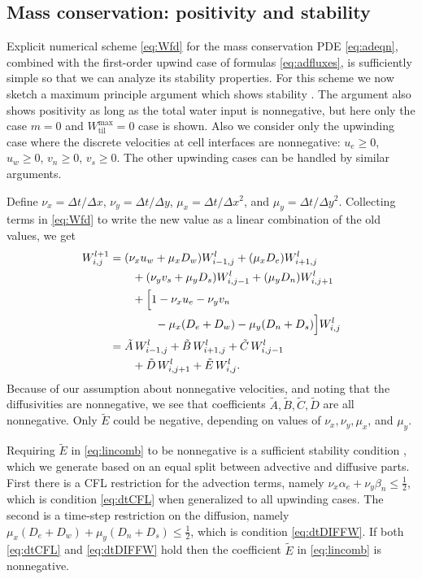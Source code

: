 \documentclass[gmd]{copernicus}   %
\newcommand{\text}{\textrm}
\newcommand{\Wtilmax}{W_{\text{til}}^{\text{max}}}
\newcommand{\Wlij}{W^l_{i,j}}
\begin{document}
\subsection{Mass conservation: positivity and stability}  Explicit numerical scheme \eqref{eq:Wfd} for the mass conservation PDE \eqref{eq:adeqn}, combined with the first-order upwind case of formulas \eqref{eq:adfluxes}, is sufficiently simple so that we can analyze its stability properties.  For this scheme we now sketch a maximum principle argument which shows stability \citep{MortonMayers}.  The argument also shows positivity \citep{HundsdorferVerwer2010} as long as the total water input is nonnegative, but here only the case $m = 0$ and $\Wtilmax=0$ case is shown.  Also we consider only the upwinding case where the discrete velocities at cell interfaces are nonnegative: $u_e\ge 0$, $u_w\ge 0$, $v_n\ge 0$, $v_s\ge 0$.  The other upwinding cases can be handled by similar arguments.

Define $\nu_x = \Delta t/\Delta x$, $\nu_y = \Delta t/\Delta y$, $\mu_x = \Delta t/\Delta x^2$, and $\mu_y = \Delta t/\Delta y^2$.  Collecting terms in \eqref{eq:Wfd} to write the new value as a linear combination of the old values, we get
\begin{align}
 W_{i,j}^{l+1} &= (\nu_x u_w + \mu_x D_w) W_{i-1,j}^l + (\mu_x D_e) W_{i+1,j}^l \notag \\
      &\qquad + (\nu_y v_s + \mu_y D_s) W_{i,j-1}^l + (\mu_y D_n) W_{i,j+1}^l  \notag \\
      &\qquad + \Big[1 - \nu_x u_e - \nu_y v_n \notag \\
      &\qquad\qquad - \mu_x (D_e + D_w) - \mu_y (D_n + D_s)\Big] \Wlij \notag \\
  &= \tilde A\, W_{i-1,j}^l + \tilde B\, W_{i+1,j}^l + \tilde C\, W_{i,j-1}^l \notag \\
  &\qquad + \tilde D\, W_{i,j+1}^l + \tilde E\, \Wlij. \label{eq:lincomb}
\end{align}
Because of our assumption about nonnegative velocities, and noting that the diffusivities are nonnegative, we see that coefficients $\tilde A,\tilde B,\tilde C,\tilde D$ are all nonnegative.  Only $\tilde E$ could be negative, depending on values of $\nu_x, \nu_y, \mu_x$, and $\mu_y$.  

Requiring $\tilde E$ in \eqref{eq:lincomb} to be nonnegative is a sufficient stability condition \citep{MortonMayers}, which we generate based on an equal split between advective and diffusive parts.  First there is a CFL restriction for the advection terms, namely $\nu_x \alpha_e + \nu_y \beta_n \le \frac{1}{2}$, which is condition \eqref{eq:dtCFL} when generalized to all upwinding cases.  The second is a time-step restriction on the diffusion, namely $\mu_x (D_e + D_w) + \mu_y (D_n + D_s) \le \frac{1}{2}$, which is condition \eqref{eq:dtDIFFW}.  If both \eqref{eq:dtCFL} and \eqref{eq:dtDIFFW} hold then the coefficient $\tilde E$ in \eqref{eq:lincomb} is nonnegative.
\end{document}
